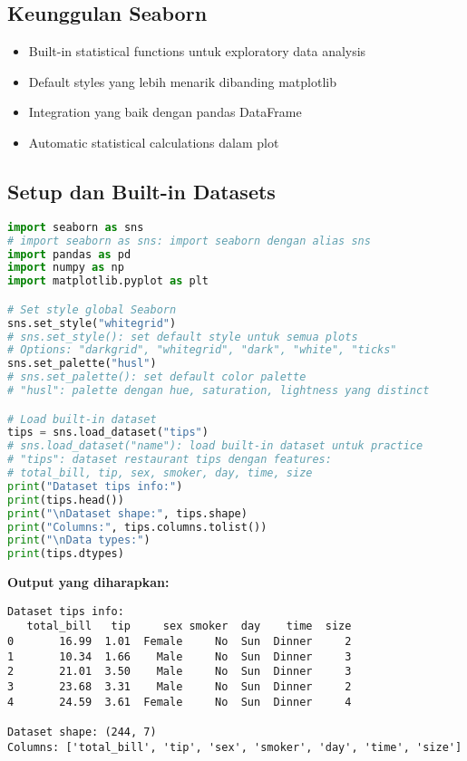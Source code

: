 \subsection*{Keunggulan Seaborn}
\begin{itemize}
  \item Built-in statistical functions untuk exploratory data analysis
  \item Default styles yang lebih menarik dibanding matplotlib
  \item Integration yang baik dengan pandas DataFrame
  \item Automatic statistical calculations dalam plot
\end{itemize}

\subsection*{Setup dan Built-in Datasets}

\begin{lstlisting}[language=python, caption={Setup Seaborn dan Load Dataset}, style=python]
import seaborn as sns
# import seaborn as sns: import seaborn dengan alias sns
import pandas as pd
import numpy as np
import matplotlib.pyplot as plt

# Set style global Seaborn
sns.set_style("whitegrid")
# sns.set_style(): set default style untuk semua plots
# Options: "darkgrid", "whitegrid", "dark", "white", "ticks"
sns.set_palette("husl")
# sns.set_palette(): set default color palette
# "husl": palette dengan hue, saturation, lightness yang distinct

# Load built-in dataset
tips = sns.load_dataset("tips")
# sns.load_dataset("name"): load built-in dataset untuk practice
# "tips": dataset restaurant tips dengan features:
# total_bill, tip, sex, smoker, day, time, size
print("Dataset tips info:")
print(tips.head())
print("\nDataset shape:", tips.shape)
print("Columns:", tips.columns.tolist())
print("\nData types:")
print(tips.dtypes)
\end{lstlisting}

\textbf{Output yang diharapkan:}
\begin{lstlisting}[style=bash]
Dataset tips info:
   total_bill   tip     sex smoker  day    time  size
0       16.99  1.01  Female     No  Sun  Dinner     2
1       10.34  1.66    Male     No  Sun  Dinner     3
2       21.01  3.50    Male     No  Sun  Dinner     3
3       23.68  3.31    Male     No  Sun  Dinner     2
4       24.59  3.61  Female     No  Sun  Dinner     4

Dataset shape: (244, 7)
Columns: ['total_bill', 'tip', 'sex', 'smoker', 'day', 'time', 'size']
\end{lstlisting}

